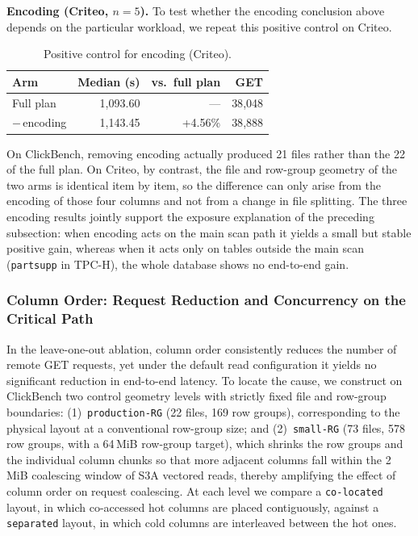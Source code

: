 \textbf{Encoding (Criteo, $n=5$).}
To test whether the encoding conclusion above depends on the particular
workload, we repeat this positive control on Criteo.

\begin{table}[t]
\centering
\caption{Positive control for encoding (Criteo).}
\label{tab:posctrl_enc}
\footnotesize
\begin{tabular}{@{}lrrr@{}}
\toprule
Arm & Median (s) & vs.\ full plan & GET \\
\midrule
Full plan       & 1{,}093.60 & ---      & 38{,}048 \\
$-$\,encoding   & 1{,}143.45 & +4.56\%  & 38{,}888 \\
\bottomrule
\end{tabular}
\end{table}

On ClickBench, removing encoding actually produced 21 files rather than the 22
of the full plan. On Criteo, by contrast, the file and row-group geometry of the
two arms is identical item by item, so the difference can only arise from the
encoding of those four columns and not from a change in file splitting. The
three encoding results jointly support the exposure explanation of the
preceding subsection: when encoding acts on the main scan path it yields a small
but stable positive gain, whereas when it acts only on tables outside the main
scan (\texttt{partsupp} in TPC-H), the whole database shows no end-to-end gain.

\subsubsection{Column Order: Request Reduction and Concurrency on the Critical Path}
\label{subsec:colorder}

In the leave-one-out ablation, column order consistently reduces the number of
remote GET requests, yet under the default read configuration it yields no
significant reduction in end-to-end latency. To locate the cause, we construct
on ClickBench two control geometry levels with strictly fixed file and
row-group boundaries: (1)~\texttt{production-RG} (22 files, 169 row groups),
corresponding to the physical layout at a conventional row-group size; and
(2)~\texttt{small-RG} (73 files, 578 row groups, with a 64\,MiB row-group
target), which shrinks the row groups and the individual column chunks so that
more adjacent columns fall within the 2\,MiB coalescing window of S3A vectored
reads, thereby amplifying the effect of column order on request coalescing. At
each level we compare a \texttt{co-located} layout, in which co-accessed hot
columns are placed contiguously, against a \texttt{separated} layout, in which
cold columns are interleaved between the hot ones.

